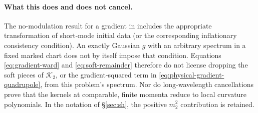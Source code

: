 \documentclass[11pt]{article}
\theoremstyle{definition}
\theoremstyle{remark}
\begin{document}
\paragraph{What this does and does not cancel.}
The no-modulation result for a gradient in \cite{MirbabayiZaldarriaga} includes the appropriate
transformation of short-mode initial data (or the corresponding inflationary consistency
condition). An exactly Gaussian $g$ with an arbitrary spectrum in a fixed marked chart does
not by itself impose that condition. Equations \eqref{eq:gradient-ward} and
\eqref{eq:soft-remainder} therefore do not license dropping the soft pieces of
$\mathcal K_2$, or the gradient-squared term in \eqref{eq:physical-gradient-quadrupole}, from
this problem's spectrum. Nor do long-wavelength cancellations prove that the kernels at
comparable, finite momenta reduce to local curvature polynomials. In the notation of
\S\ref{sec:sh}, the positive $m_2^2$ contribution is retained.
\end{document}
